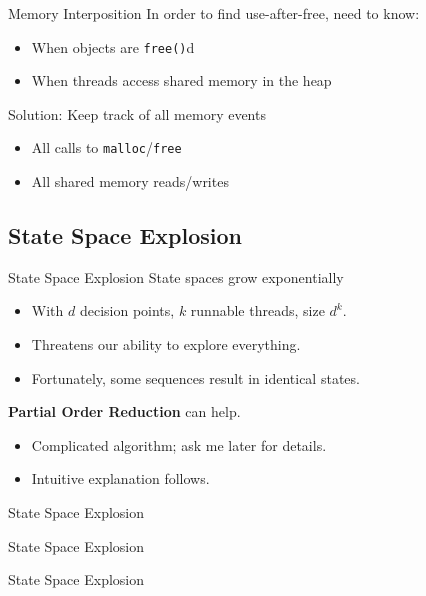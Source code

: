 \documentclass[xcolor=dvipsnames]{beamer}
\begin{document}
\begin{frame}{Memory Interposition}
	In order to find use-after-free, need to know:
	\begin{itemize}
		\item When objects are \texttt{free()}d
		\item When threads access shared memory in the heap
	\end{itemize}
	\linegap

	Solution: Keep track of all memory events
	\begin{itemize}
		\item All calls to \texttt{malloc}/\texttt{free}
		\item All shared memory reads/writes
	\end{itemize}
\end{frame}


\subsection{State Space Explosion}

\begin{frame}{State Space Explosion}
	State spaces grow exponentially
	\begin{itemize}
		\item With $d$ decision points, $k$ runnable threads, size $d^k$.
		\item Threatens our ability to explore everything.
		\item Fortunately, some sequences result in identical states.
	\end{itemize}
	\linegap

	{\bf Partial Order Reduction} can help.
	\begin{itemize}
		\item Complicated algorithm; ask me later for details.
		\item Intuitive explanation follows.
	\end{itemize}
\end{frame}

\begin{frame}{State Space Explosion}
	\begin{center}
	\end{center}
\end{frame}
\begin{frame}{State Space Explosion}
	\begin{center}
	\end{center}
\end{frame}
\begin{frame}{State Space Explosion}
	\begin{center}
	\end{center}
\end{frame}
\end{document}
